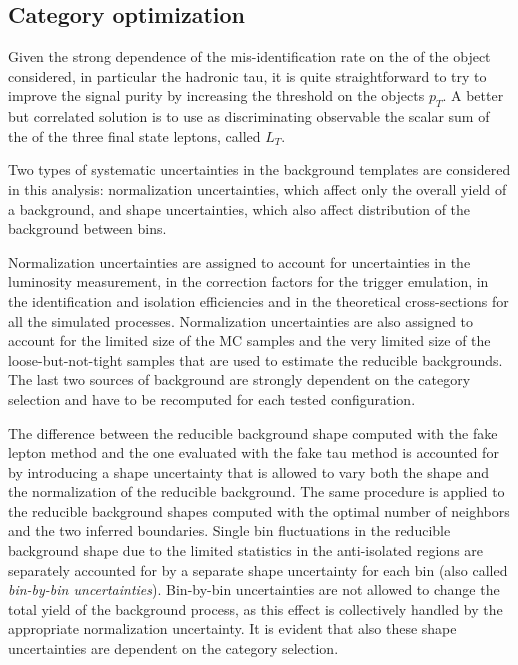 \subsection{Category optimization}

Given the strong dependence of the mis-identification rate on the \pT of the object considered, in particular the hadronic tau, it is quite straightforward to try to improve the signal purity by increasing the threshold on the objects $p_T$. A better but correlated solution is to use as discriminating observable the scalar sum of the \pT of the three final state leptons, called $L_T$.  

Two types of systematic uncertainties in the background templates are considered in this analysis: normalization uncertainties, which affect only the overall yield of a background, and shape uncertainties, which also affect distribution of the background between bins.

Normalization uncertainties are assigned to account for uncertainties in the luminosity measurement, in the correction factors for the trigger emulation, in the identification and isolation efficiencies and in the theoretical cross-sections for all the simulated processes. Normalization uncertainties are also assigned to account for the limited size of the MC samples and the very limited size of the loose-but-not-tight samples that are used to estimate the reducible backgrounds. The last two sources of background are strongly dependent on the category selection and have to be recomputed for each tested configuration.

The difference between the reducible background shape computed with the fake lepton method and the one evaluated with the fake tau method is accounted for by introducing a shape uncertainty that is allowed to vary both the shape and the normalization of the reducible background. 
The same procedure is applied to the reducible background shapes computed with the optimal number of neighbors and the two inferred boundaries. 
Single bin fluctuations in the reducible background shape due to the limited statistics in the anti-isolated regions are separately accounted for by a separate shape uncertainty for each bin (also called \emph{bin-by-bin uncertainties}). Bin-by-bin uncertainties are not allowed to change the total yield of the background process, as this effect is collectively handled by the appropriate normalization uncertainty. It is evident that also these shape uncertainties are dependent on the category selection.

